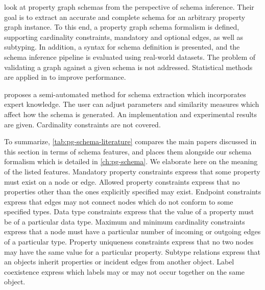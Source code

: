 \documentclass{report}
\theoremstyle{definition}
\begin{document}
\citet{lbath2021inference} look at property graph schemas from the perspective of schema inference. Their goal is to extract an accurate and complete schema for an arbitrary property graph instance. To this end, a property graph schema formalism is defined, supporting cardinality constraints, mandatory and optional edges, as well as subtyping. In addition, a syntax for schema definition is presented, and the schema inference pipeline is evaluated using real-world datasets. The problem of validating a graph against a given schema is not addressed. Statistical methods are applied in \citep{bonifati2022hierarchical} to improve performance.

\citet{lei2021thesis} proposes a semi-automated method for schema extraction which incorporates expert knowledge. The user can adjust parameters and similarity measures which affect how the schema is generated. An implementation and experimental results are given. Cardinality constraints are not covered.

To summarize, \autoref{tab:pg-schema-literature} compares the main papers discussed in this section in terms of schema features, and places them alongside our schema formalism which is detailed in \autoref{ch:pg-schema}. We elaborate here on the meaning of the listed features. Mandatory property constraints express that some property must exist on a node or edge. Allowed property constraints express that no properties other than the ones explicitly specified may exist. Endpoint constraints express that edges may not connect nodes which do not conform to some specified types. Data type constraints express that the value of a property must be of a particular data type. Maximum and minimum cardinality constraints express that a node must have a particular number of incoming or outgoing edges of a particular type. Property uniqueness constraints express that no two nodes may have the same value for a particular property. Subtype relations express that an objects inherit properties or incident edges from another object. Label coexistence express which labels may or may not occur together on the same object.
\end{document}
